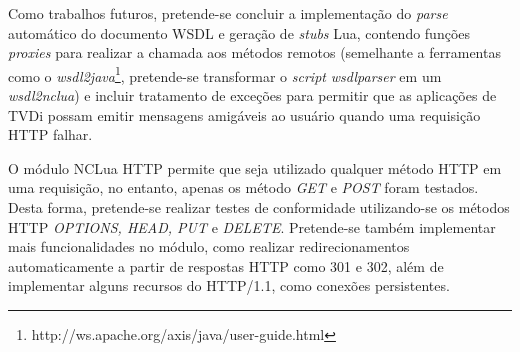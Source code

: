 Como trabalhos futuros, pretende-se concluir a implementação do \textit{parse} automático do 
documento WSDL e geração de \textit{stubs} Lua, contendo funções \textit{proxies} para realizar a chamada aos métodos remotos
(semelhante a ferramentas como o \textit{wsdl2java}\footnote{http://ws.apache.org/axis/java/user-guide.html}, 
pretende-se transformar o \textit{script} \textit{wsdlparser} em um \textit{wsdl2nclua})
e incluir tratamento de exceções para permitir que as aplicações
de TVDi possam emitir mensagens amigáveis ao usuário quando uma requisição HTTP falhar.

O módulo NCLua HTTP permite que seja utilizado qualquer método HTTP em uma requisição, no entanto,
apenas os método \textit{GET} e \textit{POST} foram testados. Desta forma, pretende-se realizar testes
de conformidade utilizando-se os métodos HTTP \textit{OPTIONS, HEAD, PUT} e \textit{DELETE}. Pretende-se também
implementar mais funcionalidades no módulo, como realizar redirecionamentos automaticamente
a partir de respostas HTTP como 301 e 302, além de implementar alguns recursos do HTTP/1.1, como
conexões persistentes.

